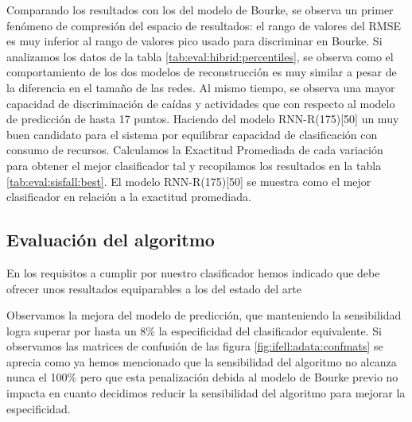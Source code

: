 Comparando los resultados con los del modelo de Bourke, se observa un primer fenómeno de compresión del espacio de resultados: el rango de valores del RMSE es muy inferior al rango de valores pico usado para discriminar en Bourke. Si analizamos los datos de la tabla \ref{tab:eval:hibrid:percentiles}, se observa como el comportamiento de los dos modelos de reconstrucción es muy similar a pesar de la diferencia en el tamaño de las redes. Al mismo tiempo, se observa una mayor capacidad de discriminación de caídas y actividades que con respecto al modelo de predicción de hasta 17 puntos.  Haciendo del modelo RNN-R(175)[50] un muy buen candidato para el sistema por equilibrar capacidad de clasificación con consumo de recursos. Calculamos la Exactitud Promediada de cada variación para obtener el mejor clasificador tal y recopilamos los resultados en la tabla \ref{tab:eval:sisfall:best}. El modelo RNN-R(175)[50] se muestra como el mejor clasificador en relación a la exactitud promediada.



\subsection{Evaluación del algoritmo}




En los requisitos a cumplir por nuestro clasificador hemos indicado que debe ofrecer unos resultados equiparables a los del estado del arte 



Observamos la mejora del modelo de predicción, que manteniendo la sensibilidad logra superar por hasta un 8\% la especificidad del clasificador equivalente. Si observamos las matrices de confusión de las figura \ref{fig:ifell:adata:confmats}  se aprecia como ya hemos mencionado que la sensibilidad del algoritmo no alcanza nunca el 100\% pero que esta penalización debida al modelo de Bourke previo no impacta en cuanto decidimos reducir la sensibilidad del algoritmo para mejorar la especificidad.


